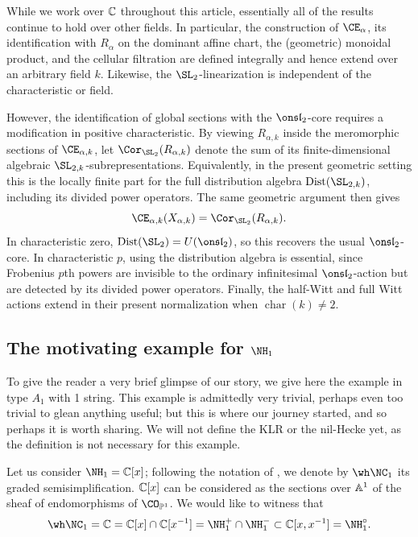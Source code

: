 \documentclass[11pt,reqno]{amsart}
\begin{document}
\begin{remark} While we work over $\mathbb C$ throughout this article, essentially all of the results continue to hold over other fields. In particular, the construction of $\CE_\alpha$, its
identification with $R_\alpha$ on the dominant affine chart, the
(geometric) monoidal product, and the cellular filtration are defined
integrally and hence extend over an arbitrary field $k$. Likewise, the 
$\SL_2$-linearization is independent of the characteristic or field.

However, the identification of global sections with the $\sl_2$-core requires a modification in positive
characteristic. By viewing $R_{\alpha,k}$ inside the meromorphic sections of
$\CE_{\alpha,k}$, let $\Cor_{\SL_2}(R_{\alpha,k})$ denote the sum of its
finite-dimensional algebraic $\SL_{2,k}$-subrepresentations. Equivalently, in the present geometric setting this is the locally finite part for the full distribution algebra $\operatorname{Dist}(\SL_{2,k})$, including its divided power operators. The same
geometric argument then gives
\[\CE_{\alpha,k}(X_{\alpha,k})=\Cor_{\SL_2}(R_{\alpha,k}).
\]
In characteristic zero, $\operatorname{Dist}(\SL_2)=U(\sl_2)$, so this recovers the usual $\sl_2$-core. In characteristic $p$, using the distribution algebra is essential, since Frobenius $p$th powers are invisible to the ordinary infinitesimal $\sl_2$-action but are detected by its divided power operators. Finally, the half-Witt and
full Witt actions extend in their present normalization when
$\operatorname{char}(k)\ne 2$.
\end{remark}

\subsection{The motivating example for $\NH_1$}
To give the reader a very brief glimpse of our story, we give here the example in type $A_1$ with 1 string. This example is admittedly very trivial, perhaps even too trivial to glean anything useful; but this is where our journey started, and so perhaps it is worth sharing. We will not define the KLR or the nil-Hecke yet, as the definition is not necessary for this example.

Let us consider $\NH_1=\BC[x]$; following the notation of \cite{KMZ}, we denote by $\wh\NC_1$ its graded semisimplification. $\mathbb C[x]$ can be considered as the sections over $\mathbb A^1$ of the sheaf of endomorphisms of $\CO_{\BP^1}$. We would like to witness that 
\[\wh\NC_1=\BC=\BC[x]\cap\BC[x^{-1}]=\NH_1^+\cap\NH_1^-\subset\BC[x,x^{-1}]=\NH_1^\circ.\]
\end{document}
